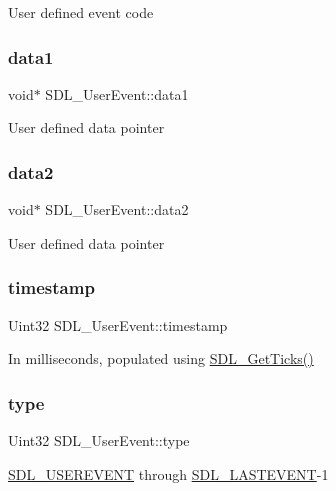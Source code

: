 User defined event code \mbox{\label{struct_s_d_l___user_event_ab2893a12be2f97195f16463a23107913}} 
\subsubsection{\texorpdfstring{data1}{data1}}
{\footnotesize\ttfamily void$\ast$ S\+D\+L\+\_\+\+User\+Event\+::data1}

User defined data pointer \mbox{\label{struct_s_d_l___user_event_aae4dbf65c34d654c9edf519eb061b7cf}} 
\subsubsection{\texorpdfstring{data2}{data2}}
{\footnotesize\ttfamily void$\ast$ S\+D\+L\+\_\+\+User\+Event\+::data2}

User defined data pointer \mbox{\label{struct_s_d_l___user_event_adbf1d34c73138a0c549310e5d4ad0c35}} 
\subsubsection{\texorpdfstring{timestamp}{timestamp}}
{\footnotesize\ttfamily Uint32 S\+D\+L\+\_\+\+User\+Event\+::timestamp}

In milliseconds, populated using \mbox{\hyperlink{_s_d_l__timer_8h_a0b9bc71d6287e0ffafdc3419760fe2b3}{S\+D\+L\+\_\+\+Get\+Ticks()}} \mbox{\label{struct_s_d_l___user_event_ab7afa8b98dbd7b52bef41155e10f7340}} 
\subsubsection{\texorpdfstring{type}{type}}
{\footnotesize\ttfamily Uint32 S\+D\+L\+\_\+\+User\+Event\+::type}

\mbox{\hyperlink{_s_d_l__events_8h_a3b589e89be6b35c02e0dd34a55f3fccaa4364c23f54802309e83fdb9b1c07c719}{S\+D\+L\+\_\+\+U\+S\+E\+R\+E\+V\+E\+NT}} through \mbox{\hyperlink{_s_d_l__events_8h_a3b589e89be6b35c02e0dd34a55f3fccaaffeac40a4ff366717c0ebc74118ea2ae}{S\+D\+L\+\_\+\+L\+A\+S\+T\+E\+V\+E\+NT}}-\/1 \mbox{\label{struct_s_d_l___user_event_abccefa10e0e0e3a0801bc6d836a08da7}} 
